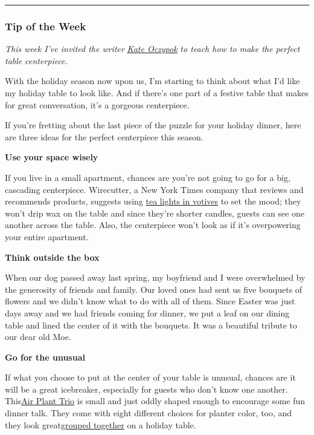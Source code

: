 \begin{center}\rule{0.5\linewidth}{\linethickness}\end{center}

\hypertarget{tip-of-the-week}{%
\subsubsection{Tip of the Week}\label{tip-of-the-week}}

\emph{This week I've invited the writer}
\href{https://twitter.com/OczyKate}{\emph{Kate Oczypok}} \emph{to teach
how to make the perfect table centerpiece.}

With the holiday season now upon us, I'm starting to think about what
I'd like my holiday table to look like. And if there's one part of a
festive table that makes for great conversation, it's a gorgeous
centerpiece.

If you're fretting about the last piece of the puzzle for your holiday
dinner, here are three ideas for the perfect centerpiece this season.

\textbf{Use your space wisely}

If you live in a small apartment, chances are you're not going to go for
a big, cascading centerpiece. Wirecutter, a New York Times company that
reviews and recommends products, suggests using
\href{https://thewirecutter.com/lists/how-to-set-the-table-for-your-first-dinner-party/}{tea
lights in votives} to set the mood; they won't drip wax on the table and
since they're shorter candles, guests can see one another across the
table. Also, the centerpiece won't look as if it's overpowering your
entire apartment.

\textbf{Think outside the box}

When our dog passed away last spring, my boyfriend and I were
overwhelmed by the generosity of friends and family. Our loved ones had
sent us five bouquets of flowers and we didn't know what to do with all
of them. Since Easter was just days away and we had friends coming for
dinner, we put a leaf on our dining table and lined the center of it
with the bouquets. It was a beautiful tribute to our dear old Moe.

\textbf{Go for the unusual}

If what you choose to put at the center of your table is unusual,
chances are it will be a great icebreaker, especially for guests who
don't know one another.
This\href{https://www.thesill.com/products/air-plant-assortment-1?variant=30392047239273}{Air
Plant Trio} is small and just oddly shaped enough to encourage some fun
dinner talk. They come with eight different choices for planter color,
too, and they look
great\href{https://thewirecutter.com/gifts/best-hostess-gifts/}{grouped
together} on a holiday table.

